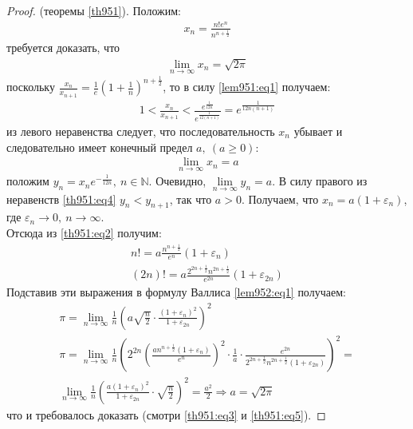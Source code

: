 \begin{proof}(теоремы \eqref{th951}).
  Положим:
  \begin{gather}
    x_n = \frac{n!e^n}{n^{n + \frac{1}{2}}}
    \label{th951:eq2}
  \end{gather}
  требуется доказать, что
  \begin{gather}
    \lim\limits_{n \to \infty} x_n = \sqrt{2\pi}
    \label{th951:eq3}
  \end{gather}
  поскольку $\frac{x_n}{x_{n+1}} = \frac{1}{e}\left( 1 + \frac{1}{n}
  \right)^{n+\frac{1}{2}}$, то в силу \eqref{lem951:eq1} получаем:
  \begin{gather}
    1 < \frac{x_n}{x_{n+1}} < \frac{e^{\frac{1}{12n}}}{e^{\frac{1}{12(n + 1)}}}
    = e^{\frac{1}{12n(n+1)}}
    \label{th951:eq4}
  \end{gather}
  из левого неравенства следует, что последовательность $x_n$ убывает и
  следовательно имеет конечный предел $a, \ (a \geq 0)$:
  \begin{gather}
    \lim\limits_{n \to \infty} x_n = a
    \label{th951:eq5}
  \end{gather}
  положим $y_n = x_n e^{-\frac{1}{12n}}, \ n \in \mathbb{N}$. Очевидно,
  $\lim\limits_{n \to \infty} y_n = a$. В силу правого из неравенств
  \eqref{th951:eq4} $y_n < y_{n+1}$, так что $a > 0$. Получаем, что $x_n = a(1
  + \varepsilon_n)$, где $\varepsilon_n \to 0, \ n \to \infty$. \\ Отсюда из
  \eqref{th951:eq2} получим:
  \begin{gather*}
    n! = a \frac{n^{n+\frac{1}{2}}}{e^n} \left( 1 + \varepsilon_n \right) \\
    (2n)! = a \frac{2^{2n + \frac{1}{2}} n^{2n + \frac{1}{2}}}{e^{2n}} (1 +
    \varepsilon_{2n})
  \end{gather*}
  Подставив эти выражения в формулу Валлиса \eqref{lem952:eq1} получаем:
  \begin{gather*}
    \pi = \lim\limits_{n \to \infty} \frac{1}{n} \left( a \sqrt{\frac{n}{2}}
    \cdot \frac{(1 + \varepsilon_n)^2}{1 + \varepsilon_{2n}} \right)^2 \\
    \pi = \lim\limits_{n \to \infty} \frac{1}{n} \left( 2^{2n}\left(
    \frac{a n^{n + \frac{1}{2}}(1+\varepsilon_n)}{e^n} \right)^2 \cdot
    \frac{1}{a} \cdot \frac{e^{2n}}{2^{2n + \frac{1}{2}} n^{2n + \frac{1}{2}}(1
    + \varepsilon_{2n})}\right)^2 = \\ \lim\limits_{n \to \infty}
    \frac{1}{n}\left( \frac{a(1 + \varepsilon_n)^2}{1 + \varepsilon_{2n}} \cdot
    \sqrt{\frac{n}{2}}\right)^2 = \frac{a^2}{2} \Longrightarrow a = \sqrt{2\pi}
  \end{gather*}
  что и требовалось доказать (смотри \eqref{th951:eq3} и \eqref{th951:eq5}).

\end{proof}
